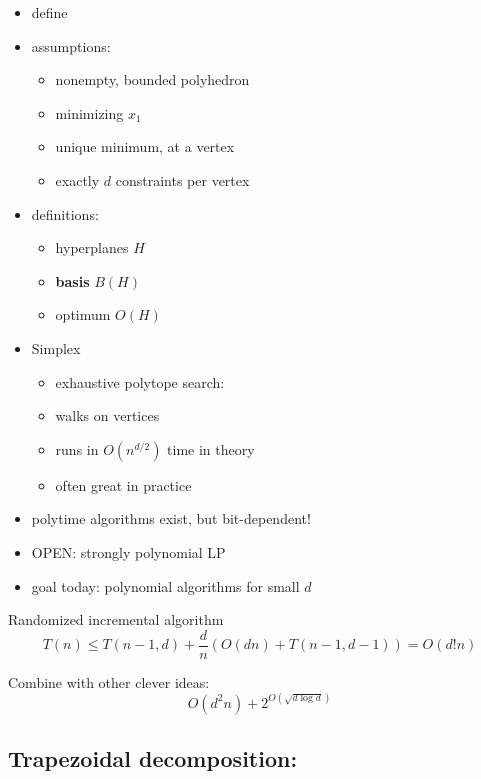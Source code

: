 \documentclass{article}
\begin{document}
\begin{itemize}
\item define
\item assumptions:
  \begin{itemize}
  \item nonempty, bounded polyhedron
  \item minimizing $x_1$
  \item unique minimum, at a vertex
  \item exactly $d$ constraints per vertex
  \end{itemize}
\item definitions:
  \begin{itemize}
  \item hyperplanes $H$
  \item \textbf{ basis} $B(H)$
  \item optimum $O(H)$
  \end{itemize}
\item Simplex
  \begin{itemize}
  \item exhaustive polytope search:
  \item walks on vertices
  \item runs in $O(n^{d/2})$ time in theory
  \item often great in practice
  \end{itemize}
\item polytime algorithms exist, but bit-dependent!
\item OPEN: strongly polynomial LP
\item goal today: polynomial algorithms for small $d$
\end{itemize}


Randomized incremental algorithm
\[
T(n) \le T(n-1,d)+\frac{d}{n}(O(dn)+T(n-1,d-1)) = O(d!n)
\]

Combine with other clever ideas:
\[
O(d^2 n) + 2^{O(\sqrt{d \log d})}
\]

\subsection*{Trapezoidal decomposition:}
\end{document}
